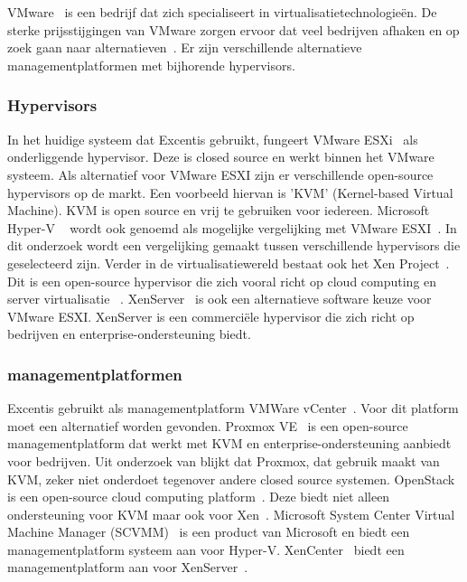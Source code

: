
\chapter{}%
\label{ch:stand-van-zaken}


VMware~\autocite{vmware} is een bedrijf dat zich specialiseert in virtualisatietechnologieën. De sterke prijsstijgingen van VMware zorgen ervoor dat veel bedrijven afhaken en op zoek gaan naar alternatieven~\autocite{Hale2024}. Er zijn verschillende alternatieve managementplatformen met bijhorende hypervisors.

\subsection{Hypervisors}
In het huidige systeem dat Excentis gebruikt, fungeert VMware ESXi~\autocite{vmware} als onderliggende hypervisor. Deze is closed source en werkt binnen het VMware systeem. Als alternatief voor VMware ESXI zijn er verschillende open-source hypervisors op de markt.
Een voorbeeld hiervan is 'KVM' (Kernel-based Virtual Machine)\autocite{KVM}. KVM is open source en vrij te gebruiken voor iedereen\autocite{KVM}. Microsoft Hyper-V ~\autocite{Eaton2019} wordt ook genoemd als mogelijke vergelijking met VMware ESXI~\autocite{fayyad2013benchmarking}. In dit onderzoek wordt een vergelijking gemaakt tussen verschillende hypervisors die geselecteerd zijn.
Verder in de virtualisatiewereld bestaat ook het Xen Project~\autocite{xenproject}. Dit is een open-source hypervisor die zich vooral richt op cloud computing en server virtualisatie ~\autocite{binu2011virtualization}.
XenServer~\autocite{xenserverwebsite} is ook een alternatieve software keuze voor VMware ESXI. XenServer is een commerciële hypervisor die zich richt op bedrijven en enterprise-ondersteuning biedt.
 
\subsection{managementplatformen}
Excentis gebruikt als managementplatform VMWare vCenter~\autocite{vmware}. Voor dit platform moet een alternatief worden gevonden.
Proxmox VE~\autocite{Proxmox} is een open-source managementplatform dat werkt met KVM en enterprise-ondersteuning aanbiedt voor bedrijven. Uit onderzoek van \textcite{ally2018comparative} blijkt dat Proxmox, dat gebruik maakt van KVM, zeker niet onderdoet tegenover andere closed source systemen.
OpenStack is een open-source cloud computing platform~\autocite{openstack2024}.
Deze biedt niet alleen ondersteuning voor KVM maar ook voor Xen~\autocite{oleksiuk2023comparative}.
Microsoft System Center Virtual Machine Manager (SCVMM)~\autocite{microsoftvmm2025} is een product van Microsoft en biedt een managementplatform systeem aan voor Hyper-V.
XenCenter~\autocite{xencenter2024} biedt een managementplatform aan voor XenServer~\autocite{xenserverwebsite}.

